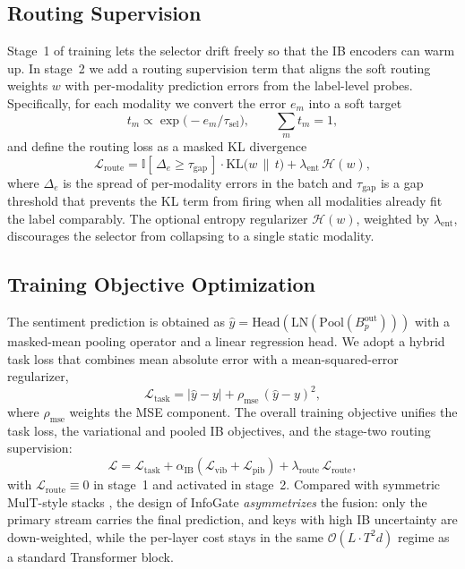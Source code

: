 \documentclass[11pt]{article}
\begin{document}
\subsection{Routing Supervision}
\label{sec:method-rib}
Stage~1 of training lets the selector drift freely so that the IB encoders can
warm up. In stage~2 we add a routing supervision term that aligns the soft
routing weights $w$ with per-modality prediction errors from the label-level
probes. Specifically, for each modality we convert the error $e_m$ into a
soft target
\begin{equation}
  t_m \propto \exp\!\bigl(-e_m / \tau_{\mathrm{sel}}\bigr),
  \qquad
  \sum_{m} t_m = 1,
\end{equation}
and define the routing loss as a masked KL divergence
\begin{equation}
  \mathcal{L}_{\mathrm{route}}
    = \mathbb{I}[\,\Delta_e \ge \tau_{\mathrm{gap}}\,]\cdot
      \mathrm{KL}\bigl(w\,\|\,t\bigr)
    + \lambda_{\mathrm{ent}}\,\mathcal{H}(w),
\end{equation}
where $\Delta_e$ is the spread of per-modality errors in the batch and
$\tau_{\mathrm{gap}}$ is a gap threshold that prevents the KL term from
firing when all modalities already fit the label comparably. The optional
entropy regularizer $\mathcal{H}(w)$, weighted by $\lambda_{\mathrm{ent}}$,
discourages the selector from collapsing to a single static modality.

\subsection{Training Objective Optimization}
\label{sec:method-loss}
The sentiment prediction is obtained as
$\hat{y} = \mathrm{Head}(\mathrm{LN}(\mathrm{Pool}(B_p^{\mathrm{out}})))$
with a masked-mean pooling operator and a linear regression head.
We adopt a hybrid task loss that combines mean absolute error with a
mean-squared-error regularizer,
\begin{equation}
  \mathcal{L}_{\mathrm{task}}
    = |\hat{y} - y| + \rho_{\mathrm{mse}}\,(\hat{y} - y)^2,
\end{equation}
where $\rho_{\mathrm{mse}}$ weights the MSE component.
The overall training objective unifies the task loss, the variational and
pooled IB objectives, and the stage-two routing supervision:
\begin{equation}
  \mathcal{L}
    = \mathcal{L}_{\mathrm{task}}
    + \alpha_{\mathrm{IB}}\!\left(\mathcal{L}_{\mathrm{vib}}
        + \mathcal{L}_{\mathrm{pib}}\right)
    + \lambda_{\mathrm{route}}\,\mathcal{L}_{\mathrm{route}},
\end{equation}
with $\mathcal{L}_{\mathrm{route}} \equiv 0$ in stage~1 and activated in
stage~2.
Compared with symmetric MulT-style stacks \citep{tsai2019multimodal}, the
design of InfoGate \emph{asymmetrizes} the fusion: only the primary stream
carries the final prediction, and keys with high IB uncertainty are
down-weighted, while the per-layer cost stays in the same
$\mathcal{O}(L \cdot T^2 d)$ regime as a standard Transformer block.
\end{document}
